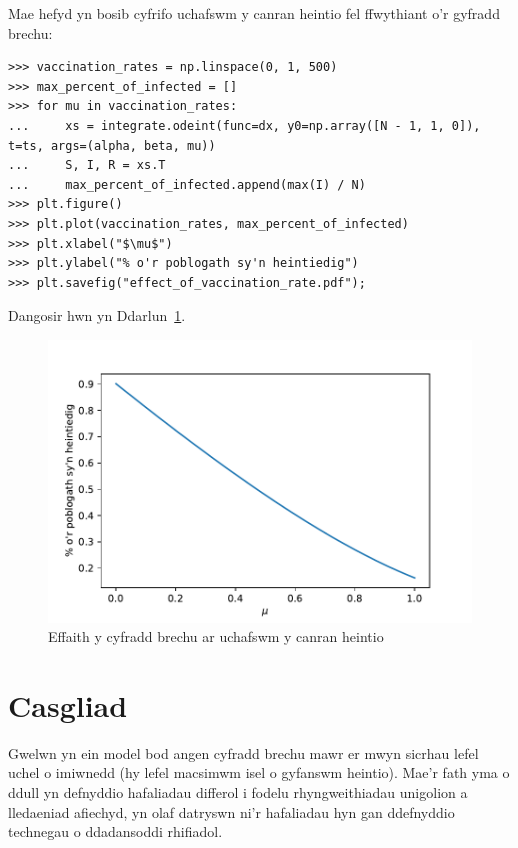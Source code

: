 \documentclass[a4paper]{article}
\begin{document}
Mae hefyd yn bosib cyfrifo uchafswm y canran heintio fel ffwythiant o'r gyfradd
brechu:

\begin{verbatim}
>>> vaccination_rates = np.linspace(0, 1, 500)
>>> max_percent_of_infected = []
>>> for mu in vaccination_rates:
...     xs = integrate.odeint(func=dx, y0=np.array([N - 1, 1, 0]), t=ts, args=(alpha, beta, mu))
...     S, I, R = xs.T
...     max_percent_of_infected.append(max(I) / N)
>>> plt.figure()
>>> plt.plot(vaccination_rates, max_percent_of_infected)
>>> plt.xlabel("$\mu$")
>>> plt.ylabel("% o'r poblogath sy'n heintiedig")
>>> plt.savefig("effect_of_vaccination_rate.pdf");
\end{verbatim}

Dangosir hwn yn Ddarlun~\ref{fig:effect_of_vaccination_rate}.

\begin{figure}[!hbtp]
    \begin{center}
        \includegraphics[width=.6\textwidth]{effect_of_vaccination_rate.pdf}
        \caption{Effaith y cyfradd brechu ar uchafswm y canran heintio}
        \label{fig:effect_of_vaccination_rate}
    \end{center}
\end{figure}

\section{Casgliad}

Gwelwn yn ein model bod angen cyfradd brechu mawr er mwyn sicrhau lefel uchel o
imiwnedd (hy lefel macsimwm isel o gyfanswm heintio). Mae'r fath yma o ddull yn
defnyddio hafaliadau differol i fodelu rhyngweithiadau unigolion a lledaeniad
afiechyd, yn olaf datryswn ni'r hafaliadau hyn gan ddefnyddio technegau o
ddadansoddi rhifiadol.



\end{document}
